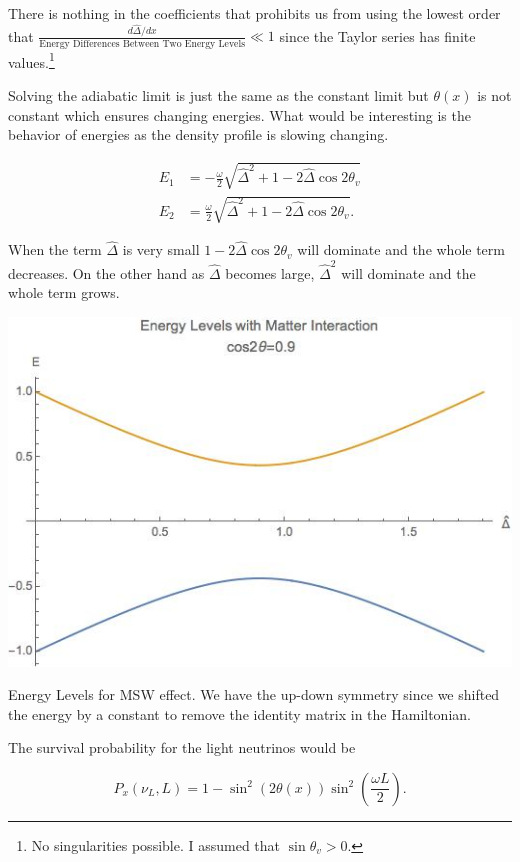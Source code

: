 \documentclass{tufte-handout}
\begin{document}
There is nothing in the coefficients that prohibits us from using the lowest order that $\frac{d\hat\Delta /dx}{\text{Energy Differences Between Two Energy Levels}}\ll 1$ since the Taylor series has finite values.\footnote{No singularities possible. I assumed that $\sin \theta_v >0$. }

Solving the adiabatic limit is just the same as the constant limit but $\theta(x)$ is not constant which ensures changing energies. What would be interesting is the behavior of energies as the density profile is slowing changing.

\begin{align*}
E_1 & = -\frac{\omega}{2}\sqrt{\hat\Delta^2 + 1 - 2 \hat\Delta  \cos 2\theta_v} \\
E_2 & = \frac{\omega}{2}\sqrt{\hat\Delta^2 + 1 - 2 \hat\Delta  \cos 2\theta_v}.
\end{align*}

When the term $\hat\Delta$ is very small $1-2\hat\Delta\cos 2\theta_v$ will dominate and the whole term decreases. On the other hand as $\hat\Delta$ becomes large, $\hat\Delta^2$ will dominate and the whole term grows.


\begin{marginfigure}
\includegraphics{assets/mswEnergyLevels}
\caption{Energy Levels for MSW effect. We have the up-down symmetry since we shifted the energy by a constant to remove the identity matrix in the Hamiltonian.}
\end{marginfigure}


The survival probability for the light neutrinos would be

\begin{equation*}
P_x(\nu_L,L) = 1 - \sin^2(2\theta (x))\sin^2\left( \frac{\omega L}{2} \right) .
\end{equation*}
\end{document}
